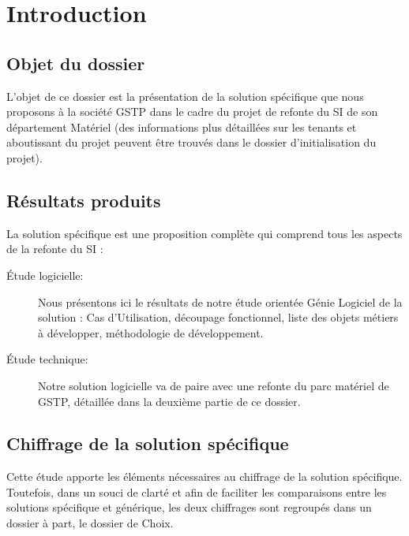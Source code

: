 \section{Introduction}


\subsection{Objet du dossier}

L'objet de ce dossier est la présentation de la solution spécifique que
nous proposons à la société GSTP dans le cadre du projet de refonte du SI
de son département Matériel (des informations plus détaillées sur les
tenants et aboutissant du projet peuvent être trouvés dans le dossier
d'initialisation du projet).


\subsection{Résultats produits}

La solution spécifique est une proposition complète qui comprend tous les
aspects de la refonte du SI :

\begin{description}

\item[Étude logicielle:]\el
Nous présentons ici le résultats de notre étude orientée Génie Logiciel de
la solution : Cas d'Utilisation, découpage fonctionnel, liste des objets
métiers à développer, méthodologie de développement.

\item[Étude technique:]\el
Notre solution logicielle va de paire avec une refonte du parc matériel de
GSTP, détaillée dans la deuxième partie de ce dossier.

\end{description}

\subsection{Chiffrage de la solution spécifique}

Cette étude apporte les éléments nécessaires au chiffrage de la solution
spécifique. Toutefois, dans un souci de clarté et afin de faciliter les
comparaisons entre les solutions spécifique et générique, les deux
chiffrages sont regroupés dans un dossier à part, le dossier de Choix.
